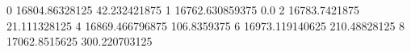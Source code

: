 0 16804.86328125 42.232421875
1 16762.630859375 0.0
2 16783.7421875 21.111328125
4 16869.466796875 106.8359375
6 16973.119140625 210.48828125
8 17062.8515625 300.220703125
